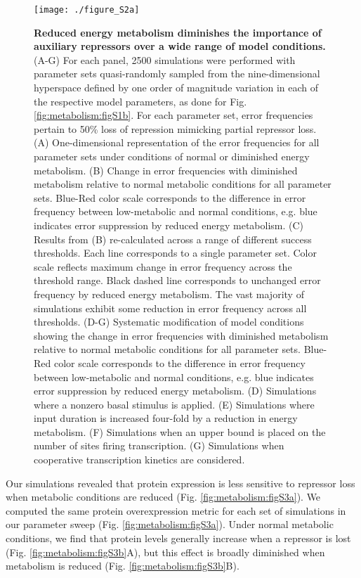 \begin{figure}[h!]
\centering
\texttt{[image: ./figure\_S2a]}
\caption[Robustness of reduced metabolism simulations to model assumptions.]{\textbf{Reduced energy metabolism diminishes the importance of auxiliary repressors over a wide range of model conditions.} (A-G) For each panel, 2500 simulations were performed with parameter sets quasi-randomly sampled from the nine-dimensional hyperspace defined by one order of magnitude variation in each of the respective model parameters, as done for Fig. \ref{fig:metabolism:figS1b}. For each parameter set, error frequencies pertain to 50\% loss of repression mimicking partial repressor loss. (A) One-dimensional representation of the error frequencies for all parameter sets under conditions of normal or diminished energy metabolism. (B) Change in error frequencies with diminished metabolism relative to normal metabolic conditions for all parameter sets. Blue-Red color scale corresponds to the difference in error frequency between low-metabolic and normal conditions, e.g. blue indicates error suppression by reduced energy metabolism. (C) Results from (B) re-calculated across a range of different success thresholds. Each line corresponds to a single parameter set. Color scale reflects maximum change in error frequency across the threshold range. Black dashed line corresponds to unchanged error frequency by reduced energy metabolism. The vast majority of simulations exhibit some reduction in error frequency across all thresholds. (D-G) Systematic modification of model conditions showing the change in error frequencies with diminished metabolism relative to normal metabolic conditions for all parameter sets. Blue-Red color scale corresponds to the difference in error frequency between low-metabolic and normal conditions, e.g. blue indicates error suppression by reduced energy metabolism. (D) Simulations where a nonzero basal stimulus is applied. (E) Simulations where input duration is increased four-fold by a reduction in energy metabolism. (F) Simulations when an upper bound is placed on the number of sites firing transcription. (G) Simulations when cooperative transcription kinetics are considered.}
\label{fig:metabolism:figS2a}
\end{figure}

Our simulations revealed that protein expression is less sensitive to repressor loss when metabolic conditions are reduced (Fig. \ref{fig:metabolism:figS3a}). We computed the same protein overexpression metric for each set of simulations in our parameter sweep (Fig. \ref{fig:metabolism:figS3a}). Under normal metabolic conditions, we find that protein levels generally increase when a repressor is lost (Fig. \ref{fig:metabolism:figS3b}A), but this effect is broadly diminished when metabolism is reduced (Fig. \ref{fig:metabolism:figS3b}B).

